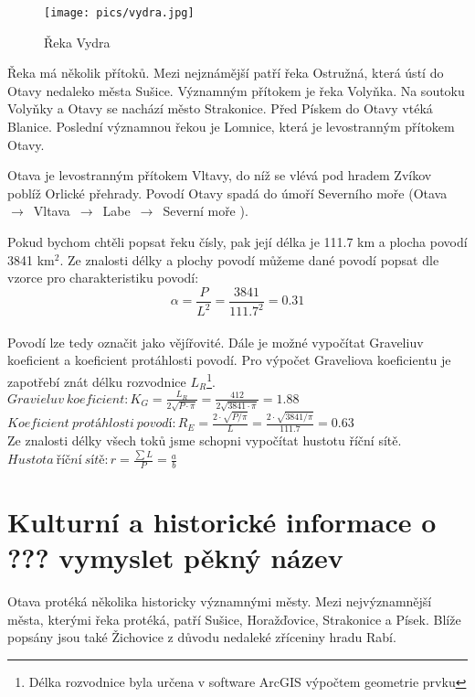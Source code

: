 \documentclass[thesis=M,czech]{FITthesis}[2012/06/26]
\begin{document}
\begin{figure}[h!]
	\centering
	\texttt{[image: pics/vydra.jpg]}
	\caption{Řeka Vydra}
	\label{obrazek:ot1}
\end{figure}

Řeka má několik přítoků. Mezi nejznámější patří řeka Ostružná, která ústí do Otavy nedaleko města Sušice. Významným přítokem je řeka Volyňka. Na soutoku Volyňky a Otavy se nachází město Strakonice. Před Pískem do Otavy vtéká Blanice. Poslední významnou řekou je Lomnice, která je levostranným přítokem Otavy. 

Otava je levostranným přítokem Vltavy, do níž se vlévá pod hradem Zvíkov poblíž Orlické přehrady. Povodí Otavy spadá do úmoří Severního moře (Otava~$\rightarrow$~Vltava~$\rightarrow$~Labe~$\rightarrow$~Severní moře ). 


Pokud bychom chtěli popsat řeku čísly, pak její délka je 111.7 km a plocha povodí 3841 km$^2$. Ze znalosti délky a plochy povodí můžeme dané povodí popsat dle vzorce pro charakteristiku povodí:\\


$$\alpha = \frac{P}{L^2} = \frac{3841}{111.7^2} = 0.31$$ \\


Povodí lze tedy označit jako vějířovité. Dále je možné vypočítat Graveliuv koeficient a koeficient protáhlosti povodí. Pro výpočet Graveliova koeficientu je zapotřebí znát délku rozvodnice $L_R$\footnote{Délka rozvodnice byla určena v software ArcGIS výpočtem geometrie prvku}. \\

$Gravieluv\ koeficient: K_G = \frac{L_R}{2 \sqrt{P \cdot \pi}} = \frac{412}{2\sqrt{3841\cdot \pi}} = 1.88$ \\

$Koeficient\ protáhlosti\ povodí: R_E = \frac{2\cdot \sqrt{P / \pi}}{L} = \frac{2 \cdot \sqrt{3841 / \pi}}{111.7} = 0.63 $ \\



Ze znalosti délky všech toků jsme schopni vypočítat hustotu říční sítě.\\

$Hustota\ říční\ sítě: r = \frac{\sum L}{P} = \frac{a}{b} $


\section{Kulturní a historické informace o ??? vymyslet pěkný název}
Otava protéká několika historicky významnými městy. Mezi nejvýznamnější města, kterými řeka protéká, patří Sušice, Horažďovice, Strakonice a Písek. Blíže popsány jsou také Žichovice z důvodu nedaleké zříceniny hradu Rabí.
\end{document}
